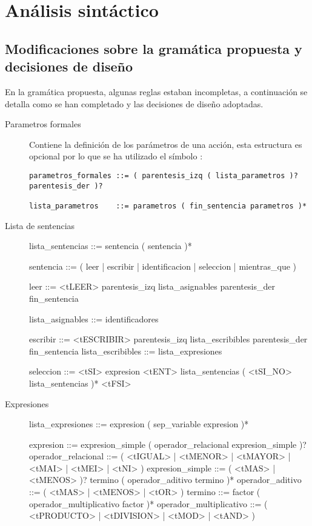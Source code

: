 \documentclass[../main.tex]{subfiles}
\begin{document}
\section{Análisis sintáctico}

\subsection{Modificaciones sobre la gramática propuesta y decisiones de diseño}
En la gramática propuesta, algunas reglas estaban incompletas, a continuación se detalla como se han completado y las decisiones de diseño adoptadas.

\begin{description}
\item[Parametros formales] Contiene la definición de los parámetros de una acción, esta estructura es opcional por lo que se ha utilizado el símbolo :
\begin{verbatim}
parametros_formales	::=	( parentesis_izq ( lista_parametros )? parentesis_der )?

lista_parametros	::=	parametros ( fin_sentencia parametros )*

\end{verbatim}


\item[Lista de sentencias]

lista_sentencias	::=	sentencia ( sentencia )*

sentencia	::=	( leer | escribir | identificacion | seleccion | mientras_que )


leer	::=	<tLEER> parentesis_izq lista_asignables parentesis_der fin_sentencia

lista_asignables	::=	identificadores

escribir	::=	<tESCRIBIR> parentesis_izq lista_escribibles parentesis_der fin_sentencia
lista_escribibles	::=	lista_expresiones




seleccion	::=	<tSI> expresion <tENT> lista_sentencias ( <tSI_NO> lista_sentencias )* <tFSI>



\item[Expresiones]

lista_expresiones	::=	expresion ( sep_variable expresion )*

expresion	::=	expresion_simple ( operador_relacional expresion_simple )?
operador_relacional	::=	( <tIGUAL> | <tMENOR> | <tMAYOR> | <tMAI> | <tMEI> | <tNI> )
expresion_simple	::=	( <tMAS> | <tMENOS> )? termino ( operador_aditivo termino )*
operador_aditivo	::=	( <tMAS> | <tMENOS> | <tOR> )
termino	::=	factor ( operador_multiplicativo factor )*
operador_multiplicativo	::=	( <tPRODUCTO> | <tDIVISION> | <tMOD> | <tAND> )

\end{description}
\end{document}
